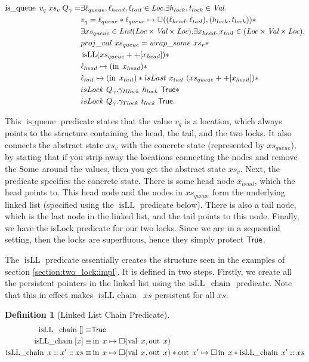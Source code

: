 \documentclass[twoside,11pt,openright]{report}
\newtheorem{definition}{Definition}[section]
\newcommand{\isqueue}{\operatorname{is\_queue}}
\newcommand{\isLLchain}[1]{\operatorname{isLL\_chain} \; #1}
\newcommand{\isLL}{\operatorname{isLL}}
\newcommand{\nIn}[1]{\operatorname{in} \; #1}
\newcommand{\nVal}[1]{\operatorname{val} \; #1}
\newcommand{\nOut}[1]{\operatorname{out} \; #1}
\begin{document}
\begin{align*}
  \isqueue \; v_q \; xs_v \; Q_\gname = &\exists \loc_{queue}, \loc_{head}, \loc_{tail} \in \Loc . \exists h_{lock}, t_{lock} \in \Val . \\
  &v_q = \loc_{queue} \ast \loc_{queue} \mapsto\persistently ((\loc_{head}, \loc_{tail}), (h_{lock}, t_{lock})) \ast\\
  &\exists xs_{queue} \in \List (\Loc \times \Val \times \Loc) . \exists x_{head}, x_{tail} \in (\Loc \times \Val \times \Loc) .\\
	&proj\_val \ xs_{queue} = wrap\_some \ xs_v \ast\\
	&\isLL (xs_{queue} ++ [x_{head}]) \ast\\
	&\loc_{head} \mapsto (\nIn{x_{head}}) \ast\\
	&\loc_{tail} \mapsto (\nIn{x_{tail}}) \ast isLast \ x_{tail} \ (xs_{queue} ++ [x_{head}]) \ast\\
	&isLock \ Q_\gname.\gname_{Hlock} \ h_{lock} \ \TRUE \ast\\
	&isLock \ Q_\gname.\gname_{Tlock} \ t_{lock} \ \TRUE.
\end{align*}

This $\isqueue$ predicate states that the value $v_q$ is a location, which always points to the structure containing the head, the tail, and the two locks. It also connects the abstract state $xs_v$ with the concrete state (represented by $xs_{queue}$), by stating that if you strip away the locations connecting the nodes and remove the $\operatorname{Some}$ around the values, then you get the abstract state $xs_v$. Next, the predicate specifies the concrete state. There is some head node $x_{head}$, which the head points to. This head node and the nodes in $xs_{queue}$ form the underlying linked list (specified using the $\isLL$ predicate below). There is also a tail node, which is the last node in the linked list, and the tail points to this node.
Finally, we have the isLock predicate for our two locks. Since we are in a sequential setting, then the locks are superfluous, hence they simply protect $\textsf{True}$.

The $\isLL$ predicate essentially creates the structure seen in the examples of section \ref{section:two_lock:impl}. It is defined in two steps. Firstly, we create all the persistent pointers in the linked list using the $\isLLchain$ predicate. Note that this in effect makes $\isLLchain \ xs$ persistent for all $xs$.
\begin{definition}[Linked List Chain Predicate]
  \begin{align*}
    \isLLchain{[]} \equiv& \TRUE\\
    \isLLchain{[x]} \equiv& \nIn{x} \mapsto\square (\nVal{x}, \nOut{x})\\
    \isLLchain{x :: x' :: xs} \equiv& \nIn{x} \mapsto\square (\nVal{x}, \nOut{x}) \ast \nOut{x'} \mapsto\square \nIn{x} \ast \isLLchain{x' :: xs}
  \end{align*}
\end{definition}
\end{document}
